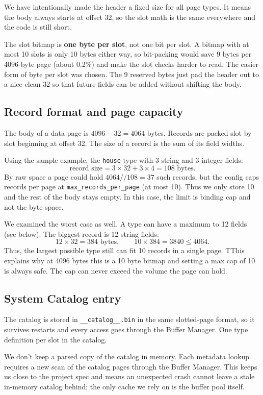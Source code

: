 \documentclass[12pt]{article}
\begin{document}
We have intentionally made the header a fixed size for all page types. It means
the body always starts at offset 32, so the slot math is the same
everywhere and the code is still short.

The slot bitmap is \textbf{one byte per slot}, not one bit per slot. A bitmap with at
most 10 slots is only 10 bytes either way, so bit-packing would
save 9 bytes per 4096-byte page (about 0.2\%) and make the slot
checks harder to read. The easier form of byte per slot was chosen. The 9
reserved bytes just pad the header out to a nice clean 32 so that future fields can
be added without shifting the body.

\subsection{Record format and page capacity}

The body of a data page is $4096 - 32 = 4064$ bytes. Records are packed
slot by slot beginning at offset 32. The size of a record is the sum of its
field widths.

Using the sample example, the \texttt{house} type with 3 string and 3 integer
fields:
\[
\text{record size} = 3\times 32 + 3\times 4 = 108 \text{ bytes}.
\]
By raw space a page could hold $4064 // 108 = 37$ such records, but the
config caps records per page at \texttt{max\_records\_per\_page} (at most
10). Thus we only store 10 and the rest of the body stays empty. In this case, the
limit is binding cap and not the byte space.

We examined the worst case as well. A type can have a maximum to 12 fields (see
below). The biggest record is 12 string fields:
\[
12 \times 32 = 384 \text{ bytes}, \qquad 10 \times 384 = 3840 \le 4064.
\]
Thus, the largest possible type still can fit 10 records in a single page. TThis explains why at 4096 bytes this is a 10 byte bitmap and setting a max cap of 10 is always safe. 
The cap can never exceed the volume the page can hold.

\subsection{System Catalog entry}

The catalog is stored in \texttt{\_\_catalog\_\_.bin} in the same
slotted-page format, so it survives restarts and every access goes through
the Buffer Manager. One type definition per slot in the catalog.

We don't keep a parsed copy of the catalog in memory. Each metadata
lookup requires a new scan of the catalog pages through the Buffer Manager. This keeps
us close to the project spec and means an unexpected crash cannot leave a
stale in-memory catalog behind; the only cache we rely on is the buffer
pool itself.
\end{document}
